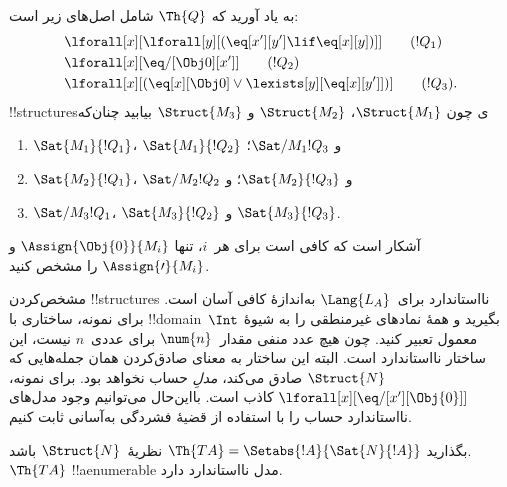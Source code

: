 \documentclass[../../../include/open-logic-section]{subfiles}
\begin{document}
\begin{prob}
به یاد آورید که $\Th{Q}$ شامل اصل‌های زیر است:
\begin{align*}
& \lforall[x][\lforall[y][(\eq[x'][y'] \lif \eq[x][y])]] \tag{$!Q_1$}\\
& \lforall[x][\eq/[\Obj 0][x']] \tag{$!Q_2$}\\
& \lforall[x][(\eq[x][\Obj 0] \lor \lexists[y][\eq[x][y']])] \tag{$!Q_3$}.
\end{align*}
!!{structure}sی چون $\Struct{M_1}$، $\Struct{M_2}$ و
$\Struct{M_3}$ بیابید چنان‌که
\begin{enumerate}
\item $\Sat{M_1}{!Q_1}$، $\Sat{M_1}{!Q_2}$ و $\Sat/{M_1}{!Q_3}$؛
\item $\Sat{M_2}{!Q_1}$، $\Sat/{M_2}{!Q_2}$ و $\Sat{M_2}{!Q_3}$؛ و
\item $\Sat/{M_3}{!Q_1}$، $\Sat{M_3}{!Q_2}$ و $\Sat{M_3}{!Q_3}$.
\end{enumerate}
آشکار است که کافی است برای هر~$i$، تنها
$\Assign{\Obj{0}}{M_i}$ و $\Assign{\prime}{M_i}$ را مشخص کنید.
\end{prob}

\begin{explain}
مشخص‌کردن !!{structure}s نااستاندارد برای~$\Lang{L_A}$ به‌اندازهٔ کافی
آسان است. برای نمونه، ساختاری با !!{domain}~$\Int$ بگیرید و
همهٔ نمادهای غیرمنطقی را به شیوهٔ معمول تعبیر کنید. چون هیچ عدد منفی
مقدار~$\num{n}$ برای عددی~$n$ نیست، این ساختار نااستاندارد
است. البته این ساختار به معنای صادق‌کردن همان جمله‌هایی که
$\Struct{N}$ صادق می‌کند،
\emph{مدلِ} حساب نخواهد بود. برای نمونه،
$\lforall[x][\eq/[x'][\Obj{0}]]$ کاذب است. بااین‌حال می‌توانیم وجود
مدل‌های نااستاندارد حساب را با استفاده از قضیهٔ فشردگی به‌آسانی ثابت
کنیم.
\end{explain}

\begin{prop}
بگذارید $\Th{TA} = \Setabs{!A}{\Sat{N}{!A}}$ نظریهٔ~$\Struct{N}$
باشد. $\Th{TA}$ !!a{enumerable} مدل نااستاندارد دارد.
\end{prop}
\end{document}
